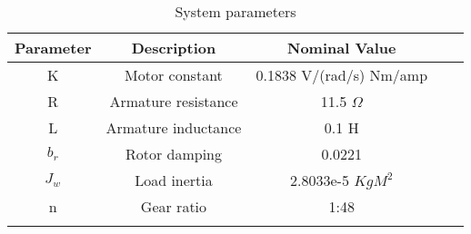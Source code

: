 \begin{table}[h]
\centering
\begin{tabular}{cccll}
\hline
Parameter                   & Description                               & Nominal Value                                 &  &  \\ \hline
\multicolumn{1}{|c|}{K}     & \multicolumn{1}{c|}{Motor constant}       & \multicolumn{1}{c|}{0.1838 V/(rad/s)  Nm/amp} &  &  \\ \cline{1-3}
\multicolumn{1}{|c|}{R}     & \multicolumn{1}{c|}{Armature resistance}  & \multicolumn{1}{c|}{11.5 $\Omega$}            &  &  \\ \cline{1-3}
\multicolumn{1}{|c|}{L}     & \multicolumn{1}{c|}{Armature inductance}  & \multicolumn{1}{c|}{0.1 H}                    &  &  \\ \cline{1-3}
\multicolumn{1}{|c|}{$b_r$} & \multicolumn{1}{c|}{Rotor damping}        & \multicolumn{1}{c|}{0.0221}                   &  &  \\ \cline{1-3}
\multicolumn{1}{|c|}{$J_w$} & \multicolumn{1}{c|}{Load inertia} & \multicolumn{1}{c|}{2.8033e-5 $KgM^2$}        &  &  \\ \cline{1-3}
\multicolumn{1}{|c|}{n}     & \multicolumn{1}{c|}{Gear ratio}           & \multicolumn{1}{c|}{1:48}                     &  &  \\ \cline{1-3}
\multicolumn{1}{l}{}        & \multicolumn{1}{l}{}                      & \multicolumn{1}{l}{}                          &  &  \\ \hline
\end{tabular}
\caption{System parameters}
\label{sys_par}
\end{table}


 